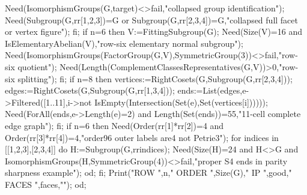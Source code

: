 \documentclass[11pt,a4paper]{article}
\begin{document}
\begin{CompleteProgram}
    Need(IsomorphismGroups(G,target)<>fail,"collapsed group identification");
    Need(Subgroup(G,rr{[1,2,3]})=G or Subgroup(G,rr{[2,3,4]})=G,"collapsed full facet or vertex figure");
  fi;
  if n=6 then
    V:=FittingSubgroup(G); Need(Size(V)=16 and IsElementaryAbelian(V),"row-six elementary normal subgroup");
    Need(IsomorphismGroups(FactorGroup(G,V),SymmetricGroup(3))<>fail,"row-six quotient");
    Need(Length(ComplementClassesRepresentatives(G,V))>0,"row-six splitting");
  fi;
  if n=8 then
    vertices:=RightCosets(G,Subgroup(G,rr{[2,3,4]}));
    edges:=RightCosets(G,Subgroup(G,rr{[1,3,4]}));
    ends:=List(edges,e->Filtered([1..11],i->not IsEmpty(Intersection(Set(e),Set(vertices[i])))));
    Need(ForAll(ends,e->Length(e)=2) and Length(Set(ends))=55,"11-cell complete edge graph");
  fi;
  if n=6 then
    Need(Order(rr[1]*rr[2])=4 and Order(rr[3]*rr[4])=4,"order96 outer labels are4 not Petrie3");
    for indices in [[1,2,3],[2,3,4]] do
      H:=Subgroup(G,rr{indices});
      Need(Size(H)=24 and H<>G and IsomorphismGroups(H,SymmetricGroup(4))<>fail,"proper S4 ends in parity sharpness example");
    od;
  fi;
  Print("ROW ",n," ORDER ",Size(G)," IP ",good," FACES ",faces,"\n");
od;


\end{CompleteProgram}
\end{document}
